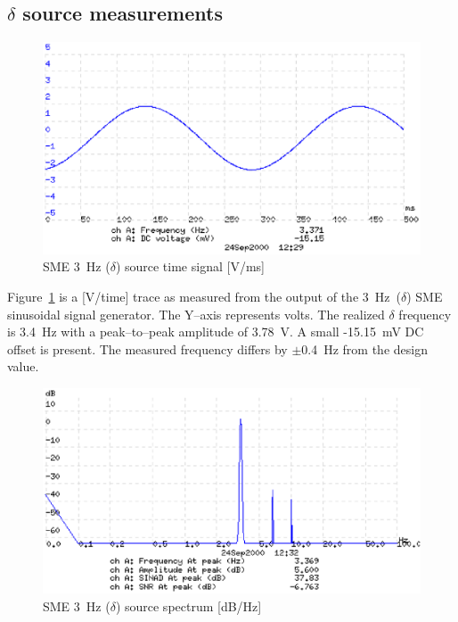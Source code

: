 \subsection{$\delta$ source measurements}

\begin{figure}[htbp]
\begin{center}
	\includegraphics[width=\textwidth]{SME31.ps}
    \caption{SME 3~Hz ($\delta$) source time signal [V/ms]}
    \label{fig:sme3-1}
\end{center}
\end{figure}

Figure~\ref{fig:sme3-1} is a [V/time] trace as measured from the
output of the 3~Hz~($\delta$) SME sinusoidal signal generator. The
Y--axis represents volts. The realized $\delta$ frequency is 3.4~Hz
with a peak--to--peak amplitude of 3.78~V. A small -15.15~mV DC offset
is present. The measured frequency differs by $\pm$0.4~Hz from the
design value.

\begin{figure}[htbp]
\begin{center}
	\includegraphics[width=\textwidth]{SME32.ps}
    \caption{SME 3~Hz ($\delta$) source spectrum [dB/Hz]}
    \label{fig:sme3-2}
\end{center}
\end{figure}

